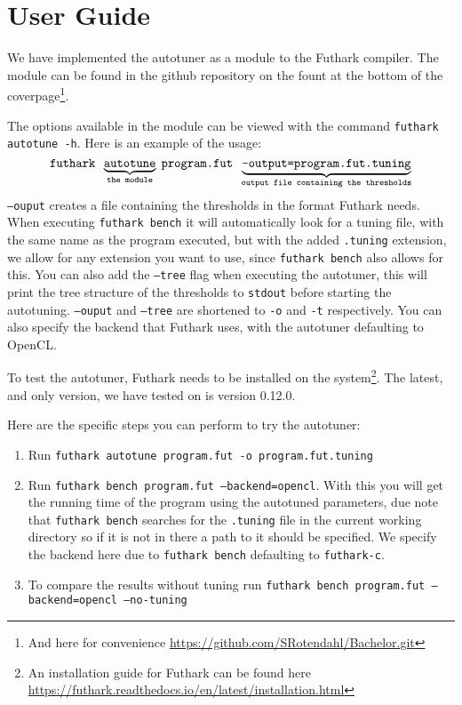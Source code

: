 \section{User Guide}
We have implemented the autotuner as a module to the Futhark compiler.
The module can be found in the github repository on the fount at the bottom of the
coverpage\footnote{And here for convenience \url{https://github.com/SRotendahl/Bachelor.git}}.

The options available in the module can be viewed with the command 
\texttt{futhark autotune -h}. Here is an example of the usage:
$$\text{\texttt{futhark }}\underbrace{\texttt{autotune}}_\text{\texttt{the module}}\;
\text{\texttt{program.fut }} \underbrace{\texttt{--output=program.fut.tuning}}_
\text{\texttt{output file containing the thresholds}}$$
\texttt{--ouput} creates a file containing the thresholds in the format Futhark needs. 
When executing \texttt{futhark bench} it will automatically look for a tuning file, 
with the same name as the program executed, but with the added \texttt{.tuning} extension, 
we allow for any extension you want to use, since \texttt{futhark bench} also allows for this.
You can also add the \texttt{--tree} flag when executing the autotuner, this will print the
tree structure of the thresholds to \texttt{stdout} before starting the autotuning. 
\texttt{--ouput} and \texttt{--tree} are shortened to \texttt{-o} and \texttt{-t} respectively.
You can also specify the backend that Futhark uses, with the autotuner defaulting to OpenCL.

To test the autotuner, Futhark needs to be installed on the system\footnote{An installation
guide for Futhark can be found here 
\url{https://futhark.readthedocs.io/en/latest/installation.html}}. 
The latest, and only version, we have tested on is version 0.12.0.  

Here are the specific steps you can perform to try the autotuner:
\begin{enumerate}
\item Run \texttt{futhark autotune program.fut -o program.fut.tuning}
\item Run \texttt{futhark bench program.fut --backend=opencl}. With this you will get the 
running time of the program using the autotuned parameters, due note that \texttt{futhark bench} searches for the \texttt{.tuning} file in the current working directory so if it is not in there a path to it should be specified. We specify the backend here due to \texttt{futhark bench} defaulting to \texttt{futhark-c}.
\item To compare the results without tuning run \texttt{futhark bench program.fut --backend=opencl --no-tuning}
\end{enumerate}